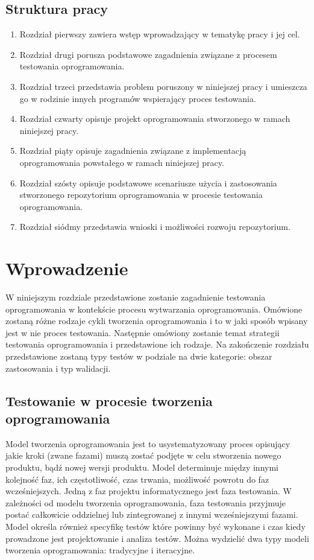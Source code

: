 \section{Struktura pracy}
\begin{enumerate}
  \item Rozdział pierwszy zawiera wstęp wprowadzający w tematykę pracy i jej  cel.
  \item Rozdział drugi porusza podstawowe zagadnienia związane z procesem testowania oprogramowania.
  \item Rozdział trzeci przedstawia problem poruszony w niniejszej pracy i umieszcza go w rodzinie innych programów wspierający proces testowania.
  \item Rozdział czwarty opisuje projekt oprogramowania stworzonego w ramach niniejszej pracy.
  \item Rozdział piąty opisuje zagadnienia związane z implementacją oprogramowania powstałego w ramach niniejszej pracy.
  \item Rozdział szósty opisuje podstawowe scenariusze użycia i zastosowania stworzonego repozytorium oprogramowania w procesie testowania oprogramowania.
  \item Rozdział siódmy przedstawia wnioski i możliwości rozwoju repozytorium.
\end{enumerate}


\chapter{Wprowadzenie}
W niniejszym rozdziale przedstawione zostanie zagadnienie testowania oprogramowania w kontekście procesu wytwarzania oprogramowania. Omówione zostaną różne rodzaje cykli tworzenia oprogramowania i to w jaki sposób wpisany jest w nie proces testowania. Następnie omówiony zostanie temat strategii testowania oprogramowania i przedstawione ich rodzaje. Na zakończenie rozdziału przedstawione zostaną typy testów w podziale na dwie kategorie: obszar zastosowania i typ walidacji.
\section{Testowanie w procesie tworzenia oprogramowania}
\label{sec:testowanieWprocesie}
Model tworzenia oprogramowania jest to usystematyzowany proces opisujący jakie kroki (zwane fazami) muszą zostać podjęte w celu stworzenia nowego produktu, bądź nowej wersji produktu. Model determinuje między innymi kolejność faz, ich częstotliwość, czas trwania, możliwość powrotu do faz wcześniejszych. Jedną z faz projektu informatycznego jest faza testowania. W zależności od modelu tworzenia oprogramowania, faza testowania przyjmuje postać całkowicie oddzielnej lub zintegrowanej z innymi wcześniejszymi fazami. Model określa również specyfikę testów które powinny być wykonane  i czas kiedy prowadzone jest projektowanie i analiza testów.
Można wydzielić dwa typy modeli tworzenia oprogramowania: tradycyjne i iteracyjne.  
